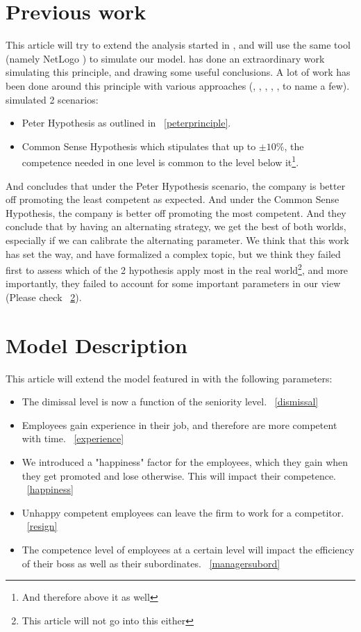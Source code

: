 \documentclass[11pt]{article}
\begin{document}
\section{Previous work}
This article will try to extend the analysis started in \cite{petercomp}, and will use the same tool (namely NetLogo \cite{netlogo}) to simulate our model. \cite{petercomp} has done an extraordinary work simulating this principle, and drawing some useful conclusions. A lot of work has been done around this principle with various approaches (\cite{faria}, \cite{dilbert-pete}, \cite{lazear}, \cite{vladan}, \cite{logistic}, to name a few). \cite{petercomp} simulated 2 scenarios:

\begin{itemize}
\item Peter Hypothesis as outlined in ~\ref{peterprinciple}.
\item Common Sense Hypothesis which stipulates that up to $\pm 10\%$, the competence needed in one level is common to the level below it\footnote{And therefore above it as well}.
\end{itemize}

And \cite{petercomp} concludes that under the Peter Hypothesis scenario, the company is better off promoting the least competent as expected. And under the Common Sense Hypothesis, the company is better off promoting the most competent. And they conclude that by having an alternating strategy, we get the best of both worlds, especially if we can calibrate the alternating parameter. We think that this work has set the way, and have formalized a complex topic, but we think they failed first to assess which of the 2 hypothesis apply most in the real world\footnote{This article will not go into this either}, and more importantly, they failed to account for some important parameters in our view (Please check ~\ref{model}).


\section{Model Description}
\label{model}

This article will extend the model featured in \cite{petercomp} with the following parameters:

\begin{itemize}
\item The dimissal level is now a function of the seniority level. ~\ref{dismissal}
\item Employees gain experience in their job, and therefore are more competent with time. ~\ref{experience}
\item We introduced a "happiness" factor for the employees, which they gain when they get promoted and lose otherwise. This will impact their competence. ~\ref{happiness}
\item Unhappy competent employees can leave the firm to work for a competitor. ~\ref{resign}
\item The competence level of employees at a certain level will impact the efficiency of their boss as well as their subordinates. ~\ref{managersubord}
\end{itemize}
\end{document}
